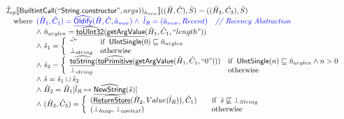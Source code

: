 \documentclass{article}
\newcommand{\SF}[1]{\mbox{\textsf{#1}}}
\newcommand{\comment}[1]{\textit{#1}}
\newcommand{\wherec}[1]{{\rm where}\begin{array}[t]{l}#1\end{array}}
\newcommand{\ifc}[1]{{\rm if}\begin{array}[t]{l}#1\end{array}}
\newcommand{\owc}{{\rm otherwise}}
\newcommand{\aI}{\hat{\mathcal{I}}}
\newcommand{\lbr}{\llbracket}
\newcommand{\rbr}{\rrbracket}
\newcommand{\hf}[1]{\underline{\sf #1}}
\newcommand{\ahf}[1]{\widehat{\underline{\sf #1}}}
\def\inblue{\color{blue}}
\def\inblue{\color{blue}}
\begin{document}
\[\begin{array}{l}
\aI _{cp}\lbr \SF{BuiltintCall}(``\SF{String.constructor}",args))_{\hat{a}_{new}}\rbr((\hat{H},\hat{C}), \hat{S})
  = ((\hat{H}_3, \hat{C_3}), \hat{S})\\
\quad\wherec{
   \inblue (\hat{H}_1, \hat{C}_1) = \ahf{Oldify}(\hat{H}, \hat{C}, \hat{a}_{new})
   \land\ \inblue\hat{l}_{R} = (\hat{a}_{new}, Recent)
     \quad\comment{{\inblue // Recency Abstraction}}\\
  \land\ \hat{n}_{arglen} = \ahf{toUInt32}(\hf{getArgValue}(\hat{H}_1, \hat{C}_1, ``length"))\\
  \land\ \hat{s}_1 = \left\{\begin{array}{ll}
       \hat{``"}
       & \ifc{\SF{UIntSingle}(0) \sqsubseteq \hat{n}_{arglen}}\\
     \bot_{string}& \owc
     \end{array}\right.\\
  \land\ \hat{s}_2 = \left\{\begin{array}{ll}
       \ahf{toString}(\ahf{toPrimitive}(\hf{getArgValue}(\hat{H}_1, \hat{C}_1, ``0")))
       & \ifc{\SF{UIntSingle}(n) \sqsubseteq \hat{n}_{arglen} \land n > 0}\\
     \bot_{string}& \owc
     \end{array}\right.\\
  \land\ \hat{s} = \hat{s}_1 \sqcup \hat{s}_2\\
  \land\ \hat{H}_2 = \hat{H}_1[\hat{l}_R \mapsto \ahf{NewString}(\hat{s})]\\
  \land\ (\hat{H}_3, \hat{C}_3) = 
    \left\{\begin{array}{l@{\quad\quad}l}
      (\ahf{ReturnStore}(\hat{H}_2, Value(\hat{l}_R)), \hat{C}_1)
      & \ifc{\hat{s} \not\sqsubseteq \bot_{String}}\\
      (\bot_{heap}, \bot_{context}) & \owc \\
    \end{array}\right.\\
  }\\
\\\\



\end{array}\]
\end{document}
